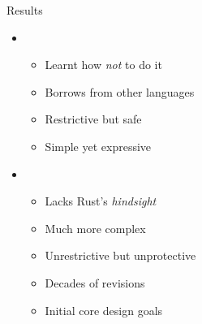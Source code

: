 \begin{frame}[t]{Results}

    \begin{itemize}
        \itemsep.3em

        \item {}
            \begin{itemize}
                \item Learnt how \textit{not} to do it
                \item Borrows from other languages
                \item Restrictive but safe
                \item Simple yet expressive
            \end{itemize}

        \item \tbf{\cpp}
            \begin{itemize}
                \item Lacks Rust's \textit{hindsight}
                \item Much more complex
                \item Unrestrictive but unprotective
                \item Decades of revisions
                \item Initial core design goals
            \end{itemize}

    \end{itemize}

    \vfill

\end{frame}
